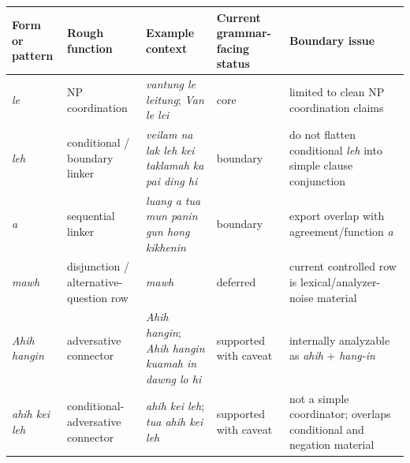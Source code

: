 \documentclass[
  11pt,
  a4paper,
]{article}
\newcounter{none} %
\newcommand{\tdim}[1]{\textit{#1}}
\begin{document}
{\def\LTcaptype{none} %
\begin{longtable}[]{@{}
  >{\raggedright\arraybackslash}p{}
  >{\raggedright\arraybackslash}p{}
  >{\raggedright\arraybackslash}p{}
  >{\raggedright\arraybackslash}p{}
  >{\raggedright\arraybackslash}p{}@{}}
\toprule\noalign{}
\begin{minipage}[b]{\linewidth}\raggedright
Form or pattern
\end{minipage} & \begin{minipage}[b]{\linewidth}\raggedright
Rough function
\end{minipage} & \begin{minipage}[b]{\linewidth}\raggedright
Example context
\end{minipage} & \begin{minipage}[b]{\linewidth}\raggedright
Current grammar-facing status
\end{minipage} & \begin{minipage}[b]{\linewidth}\raggedright
Boundary issue
\end{minipage} \\
\midrule\noalign{}
\endhead
\bottomrule\noalign{}
\endlastfoot
\tdim{le} & NP coordination & \tdim{vantung le leitung};
\tdim{Van le lei} & core & limited to clean NP coordination claims \\
\tdim{leh} & conditional / boundary linker &
\tdim{veilam na lak leh kei taklamah ka pai ding hi} & boundary & do not
flatten conditional \tdim{leh} into simple clause conjunction \\
\tdim{a} & sequential linker &
\tdim{luang a tua mun panin gun hong kikhenin} & boundary & export
overlap with agreement/function \tdim{a} \\
\tdim{mawh} & disjunction / alternative-question row & \tdim{mawh} &
deferred & current controlled row is lexical/analyzer-noise material \\
\tdim{Ahih hangin} & adversative connector & \tdim{Ahih hangin};
\tdim{Ahih hangin kuamah in dawng lo hi} & supported with caveat &
internally analyzable as \tdim{ahih} + \tdim{hang-in} \\
\tdim{ahih kei leh} & conditional-adversative connector &
\tdim{ahih kei leh}; \tdim{tua ahih kei leh} & supported with caveat &
not a simple coordinator; overlaps conditional and negation material \\
\end{longtable}
}
\end{document}
